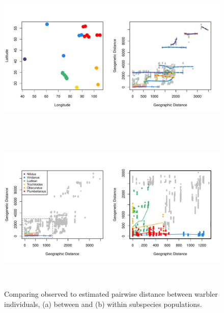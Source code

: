 \documentclass[12pt]{article}
\begin{document}
\begin{figure}
	\centering
			{\includegraphics[width=6in,height=3in]{figs/warblers/warb_ind_dist_compare_allpairs.pdf}}
			{\includegraphics[width=6in,height=3in]{figs/warblers/warb_ind_dist_compare.pdf}}
	\caption{Comparing observed to estimated pairwise distance between warbler individuals, (a) between and (b) within subspecies populations.}\label{sfig:warb_ind_distcomp}
\end{figure}
\end{document}
